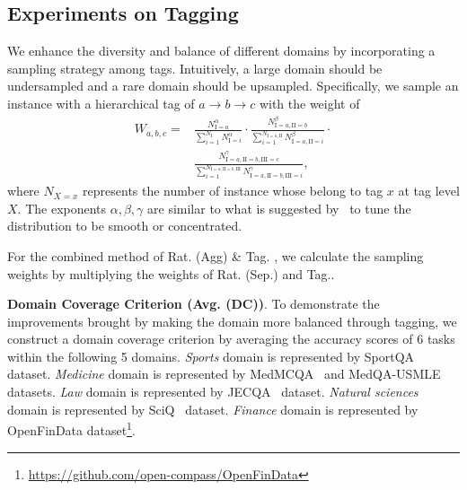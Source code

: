 \documentclass[11pt]{article}
\begin{document}
\subsection{Experiments on Tagging}
We enhance the diversity and balance of different domains by incorporating a sampling strategy among tags. Intuitively, a large domain should be undersampled and a rare domain should be upsampled. 
Specifically, we sample an instance with a hierarchical tag of $a \rightarrow b\rightarrow c$ with the weight of 
\begin{equation}
\begin{split}
W_{a, b, c} = 
& \frac{N_{\mathrm{I}=a}^\alpha}{\sum_{i=1}^{N_{\mathrm{I}}} N_{\mathrm{I}=i}^\alpha} \cdot \frac{N_{\mathrm{I}=a, \mathrm{II}=b}^\beta}{\sum_{i=1}^{N_{\mathrm{I}=a, \mathrm{II}}} N_{\mathrm{I}=a, \mathrm{II}=i}^\beta} \cdot \\
& \frac{N_{\mathrm{I}=a, \mathrm{II}=b, \mathrm{III}=c}^\gamma}{\sum_{i=1}^{N_{\mathrm{I}=a, \mathrm{II}=b, \mathrm{III}}} N_{\mathrm{I}=a, \mathrm{II}=b, \mathrm{III}=i}^\gamma} ,
\end{split}
\label{eq: tag foumula}
\end{equation}
where $N_{{X}={x}}$ represents the number of instance whose belong to tag $x$ at tag level $X$. 
The exponents $\alpha, \beta, \gamma$ are similar to what is suggested by~\citep{lample2019cross} to tune the distribution to be smooth or concentrated.



For the combined method of Rat. (Agg) \& Tag. , we calculate the sampling weights by multiplying the weights of Rat. (Sep.) and Tag..

\textbf{Domain Coverage Criterion (Avg. (DC))}. To demonstrate the improvements brought by making the domain more balanced through tagging, we construct a domain coverage criterion by averaging the accuracy scores of 6 tasks within the following 5 domains. \textit{Sports} domain is represented by SportQA~\citep{xia2024sportqa} dataset. \textit{Medicine} domain is represented by MedMCQA~\citep{pal2022medmcqa} and MedQA-USMLE~\citep{jin2021disease} datasets. \textit{Law} domain is represented by JECQA~\citep{zhong2020jec} dataset. \textit{Natural sciences} domain is represented by SciQ~\citep{welbl2017crowdsourcing} dataset. \textit{Finance} domain is represented by OpenFinData dataset\footnote{\url{https://github.com/open-compass/OpenFinData}}.
\end{document}
